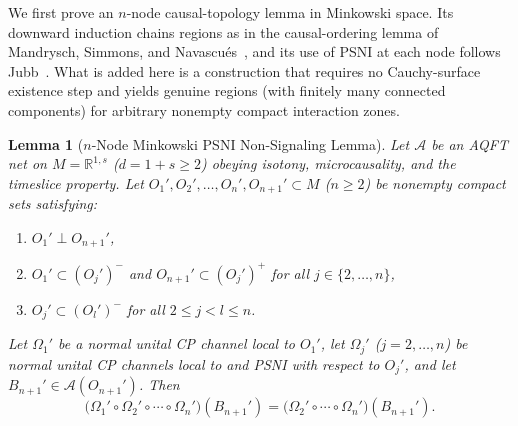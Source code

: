 \documentclass[11pt,a4paper]{article}
\newtheorem{lemma}[theorem]{Lemma}
\theoremstyle{definition}
\theoremstyle{remark}
\newcommand{\Ac}{\mathcal{A}}
\newcommand{\RR}{\mathbb{R}}
\begin{document}
We first prove an $n$-node causal-topology lemma in Minkowski space. Its downward induction chains regions as in the causal-ordering lemma of Mandrysch, Simmons, and Navascu\'es~\cite[Lemma~51, App.~F]{Mandrysch2026}, and its use of PSNI at each node follows Jubb~\cite{Jubb2022}. What is added here is a construction that requires no Cauchy-surface existence step and yields genuine regions (with finitely many connected components) for arbitrary nonempty compact interaction zones.

\begin{lemma}[$n$-Node Minkowski PSNI Non-Signaling Lemma]\label{lem:causal-topo}
Let $\Ac$ be an AQFT net on $M=\RR^{1,s}$ ($d=1+s\ge 2$) obeying isotony, microcausality, and the timeslice property. Let $O_1', O_2', \dots, O_n', O_{n+1}' \subset M$ ($n\ge 2$) be nonempty compact sets satisfying:
\begin{enumerate}[label=\textup{(\roman*)},leftmargin=*,nosep]
\item $O_1' \perp O_{n+1}'$,
\item $O_1' \subset (O_j')^-$ and $O_{n+1}' \subset (O_j')^+$ for all $j\in\{2,\dots,n\}$,
\item $O_j' \subset (O_l')^-$ for all $2\le j < l \le n$.
\end{enumerate}
Let $\Omega_1'$ be a normal unital CP channel local to $O_1'$, let $\Omega_j'$ ($j=2,\dots,n$) be normal unital CP channels local to and PSNI with respect to $O_j'$, and let $B_{n+1}'\in\Ac(O_{n+1}')$. Then
\begin{equation}\label{eq:n-node-exact}
\bigl(\Omega_1'\circ\Omega_2'\circ\cdots\circ\Omega_n'\bigr)(B_{n+1}')
= \bigl(\Omega_2'\circ\cdots\circ\Omega_n'\bigr)(B_{n+1}').
\end{equation}
\end{lemma}
\end{document}
